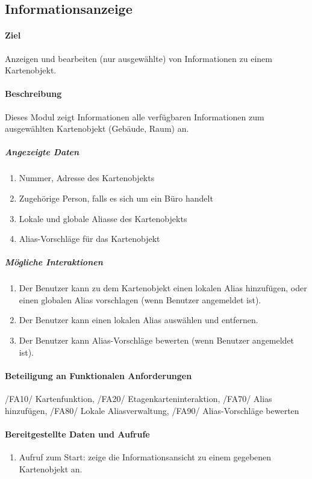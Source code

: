 \subsection{Informationsanzeige}
\paragraph{Ziel}
Anzeigen und bearbeiten (nur ausgewählte) von Informationen zu einem Kartenobjekt.
\paragraph{Beschreibung}
Dieses Modul zeigt Informationen alle verfügbaren Informationen zum ausgewählten Kartenobjekt (Gebäude, Raum) an.
\subparagraph{Angezeigte Daten}
\begin{enumerate}
    \item Nummer, Adresse des Kartenobjekts
    \item Zugehörige Person, falls es sich um ein Büro handelt
    \item Lokale und globale Aliasse des Kartenobjekts
    \item Alias-Vorschläge für das Kartenobjekt
\end{enumerate}
\subparagraph{Mögliche Interaktionen}
\begin{enumerate}
    \item Der Benutzer kann zu dem Kartenobjekt einen lokalen Alias hinzufügen, oder einen globalen Alias vorschlagen (wenn Benutzer angemeldet ist).
    \item Der Benutzer kann einen lokalen Alias auswählen und entfernen.
    \item Der Benutzer kann Alias-Vorschläge bewerten (wenn Benutzer angemeldet ist).
\end{enumerate}
\paragraph{Beteiligung an Funktionalen Anforderungen}
/FA10/ Kartenfunktion, /FA20/ Etagenkarteninteraktion, /FA70/ Alias hinzufügen, /FA80/ Lokale Aliasverwaltung, /FA90/ Alias-Vorschläge bewerten
\paragraph{Bereitgestellte Daten und Aufrufe}
\begin{enumerate}
    \item Aufruf zum Start: zeige die Informationsansicht zu einem gegebenen Kartenobjekt an.
\end{enumerate}
